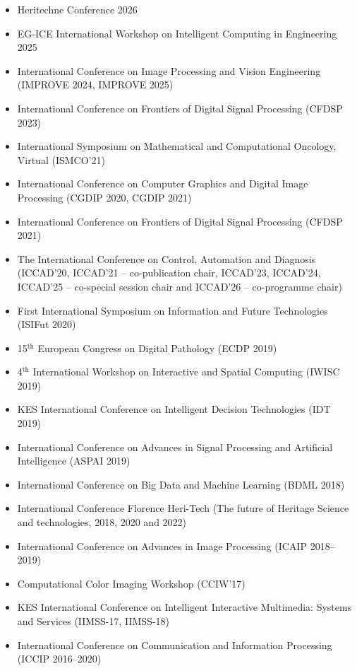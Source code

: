 \documentclass[11pt]{article}
\begin{document}
\begin{itemize} 
	\item Heritechne Conference 2026
	\item EG-ICE International Workshop on Intelligent Computing in Engineering 2025
	\item International Conference on Image Processing and Vision Engineering (IMPROVE 2024, IMPROVE 2025)
	\item International Conference on Frontiers of Digital Signal Processing (CFDSP 2023)
	\item International Symposium on Mathematical and Computational Oncology, Virtual (ISMCO'21)
	\item International Conference on Computer Graphics and Digital Image Processing (CGDIP 2020, CGDIP 2021)
	\item International Conference on Frontiers of Digital Signal Processing (CFDSP 2021)
  \item The International Conference on Control, Automation and Diagnosis (ICCAD'20, ICCAD'21 -- co-publication chair, ICCAD'23, ICCAD'24, ICCAD'25 -- co-special session chair and ICCAD'26 -- co-programme chair)
  \item First International Symposium on Information and Future Technologies (ISIFut 2020)
  \item 15$^\text{th}$ European Congress on Digital Pathology (ECDP 2019)
	\item 4$^\text{th}$ International Workshop on Interactive and Spatial Computing (IWISC 2019)
  \item KES International Conference on Intelligent Decision Technologies (IDT 2019)
  \item International Conference on Advances in Signal Processing and Artificial Intelligence (ASPAI 2019)
  \item International Conference on Big Data and Machine Learning (BDML 2018)
  \item International Conference Florence Heri-Tech (The future of Heritage Science and technologies, 2018, 2020 and 2022)
  \item International Conference on Advances in Image Processing (ICAIP 2018--2019)
  \item Computational Color Imaging Workshop (CCIW'17)
	\item KES International Conference on Intelligent Interactive Multimedia: Systems and Services (IIMSS-17, IIMSS-18)
  \item International Conference on Communication and Information Processing (ICCIP 2016--2020)

\end{itemize}
\end{document}

